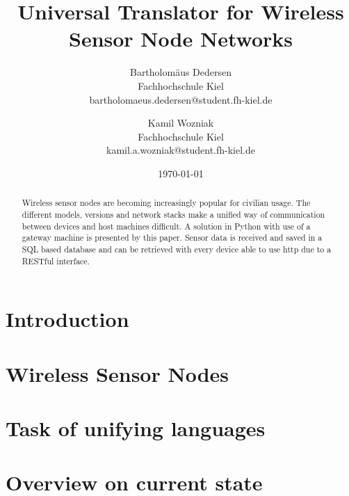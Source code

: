 \documentclass[bibtotocnumbered, headsepline,normalheadings]{report}
\begin{document}
\author{ 
Bartholomäus Dedersen \\ Fachhochschule Kiel \\ bartholomaeus.dedersen@student.fh-kiel.de \and
Kamil Wozniak  \\ Fachhochschule Kiel \\ kamil.a.wozniak@student.fh-kiel.de }

\date{\today} 
\title{Universal Translator for Wireless Sensor Node Networks} 

\maketitle


\begin{abstract}

    Wireless sensor nodes are becoming increasingly popular for civilian usage. The different models, versions and network stacks make a 
    unified way of communication between devices and host machines difficult. A solution in Python with use of a gateway machine is presented 
    by this paper. Sensor data is received and saved in a SQL based database and can be retrieved with every device able to use http due to a 
    RESTful interface.

\end{abstract}

\tableofcontents \newpage

\chapter{Introduction}



\chapter{Wireless Sensor Nodes}



\chapter{Task of unifying languages}
\label{chap:unify}



\chapter{Overview on current state}


\end{document}
